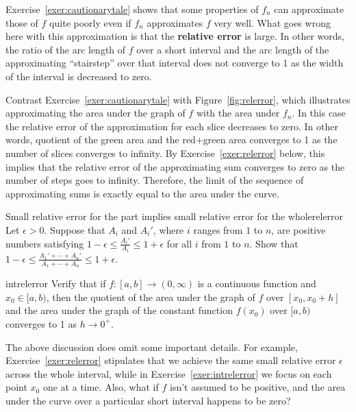 \documentclass{watsonbook}
\begin{document}
Exercise~\ref{exer:cautionarytale} shows that some properties of $f_n$
can approximate those of $f$ quite poorly even if $f_n$ approximates
$f$ very well. What goes wrong here with this approximation is that
the \textbf{relative error} is large. In other words, the ratio of the
arc length of $f$ over a short interval and the arc length of the
approximating ``stairstep'' over that interval does not converge to 1
as the width of the interval is decreased to zero.

Contrast Exercise~\ref{exer:cautionarytale} with
Figure~\ref{fig:relerror}, which illustrates approximating the area
under the graph of $f$ with the area under $f_n$. In this case the
relative error of the approximation for each slice decreases to
zero. In other words, quotient of the green area and the red+green
area converges to 1 as the number of slices converges to infinity. By
Exercise~\ref{exer:relerror} below, this implies that the relative
error of the approximating sum converges to zero as the number of
steps goes to infinity. Therefore, the limit of the sequence of
approximating sums is exactly equal to the area under the curve.

\begin{exercise}{Small relative error for the part implies small
    relative error for the whole}{relerror}
  Let $\epsilon > 0$. Suppose that $A_i$ and $A_i'$, where $i$ ranges
  from $1$ to $n$, are positive numbers satisfying
  $1-\epsilon \leq \frac{A_{i}'}{A_{i}} \leq 1 + \epsilon$ for all $i$
  from $1$ to $n$. Show that
  $1-\epsilon \leq \frac{A_1'+\cdots+A_n'}{A_1+\cdots+A_n} \leq 1 +
  \epsilon$.  
\end{exercise}

\begin{exercise}{}{intrelerror}
  Verify that if $f:[a,b] \to (0,\infty)$ is a continuous function and
  $x_0 \in [a,b)$, then the quotient of the area under the graph of $f$ over
  $[x_0,x_0+h]$ and the area under the graph of the constant function
  $f(x_0)$ over $[a,b)$ converges to 1 as $h \to 0^+$. 
\end{exercise}

The above discussion does omit some important details. For example,
Exercise~\ref{exer:relerror} stipulates that we achieve the same small
relative error $\epsilon$ across the whole interval, while in
Exercise~\ref{exer:intrelerror} we focus on each point $x_0$ one at a
time. Also, what if $f$ isn't assumed to be positive, and the area
under the curve over a particular short interval happens to be zero?
\end{document}
